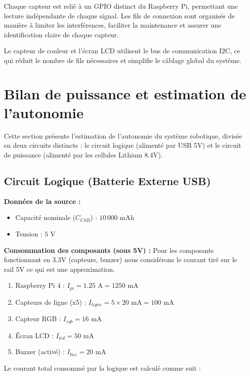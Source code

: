 Chaque capteur est relié à un GPIO distinct du Raspberry Pi, permettant une lecture indépendante de chaque signal. Les fils de connexion sont organisés de manière à limiter les interférences, faciliter la maintenance et assurer une identification claire de chaque capteur.

Le capteur de couleur et l’écran LCD utilisent le bus de communication I2C, ce qui réduit le nombre de fils nécessaires et simplifie le câblage global du système.


\section{Bilan de puissance et estimation de l'autonomie}

Cette section présente l'estimation de l'autonomie du système robotique, divisée en deux circuits distincts : le circuit logique (alimenté par USB 5V) et le circuit de puissance (alimenté par les cellules Lithium 8.4V).

\subsection{Circuit Logique (Batterie Externe USB)}

\textbf{Données de la source :}
\begin{itemize}
    \item Capacité nominale ($C_{USB}$) : $10\,000 \text{ mAh}$
    \item Tension : $5 \text{ V}$
\end{itemize}

\textbf{Consommation des composants (sous 5V) :}
Pour les composants fonctionnant en 3.3V (capteurs, buzzer) nous considérons le courant tiré sur le rail 5V ce qui est une approximation.

\begin{enumerate}
    \item Raspberry Pi 4 : $I_{pi} = 1.25 \text{ A} = 1250 \text{ mA}$
    \item Capteurs de ligne (x5) : $I_{ligne} = 5 \times 20 \text{ mA} = 100 \text{ mA}$
    \item Capteur RGB : $I_{rgb} = 16 \text{ mA}$
    \item Écran LCD : $I_{lcd} = 50 \text{ mA}$
    \item Buzzer (activé) : $I_{buz} = 20 \text{ mA}$
\end{enumerate}

Le courant total consommé par la logique est calculé comme suit :

